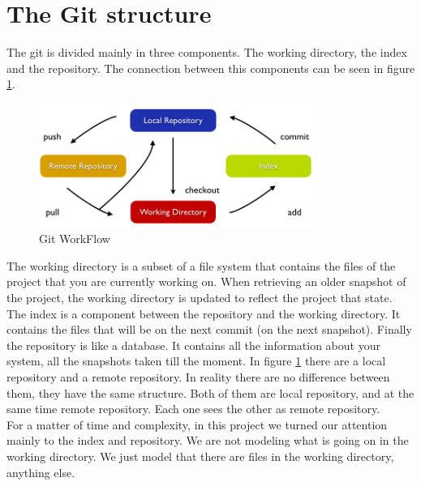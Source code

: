 \section{The Git structure}
The git is divided mainly in three components. The working directory,
the index and the repository. The connection between this components
can be seen in figure \ref{fig:git_structure}. 

\begin{figure}[h!]
   \centering
   \includegraphics[width=0.8\textwidth]{images/data_flow_simplified.png}
   \caption{Git WorkFlow}\label{fig:git_structure}
\end{figure}

The working directory is a subset of
a file system that contains the files of the project that you are
currently working on. When retrieving an older snapshot of the project, the
working directory is updated to reflect the project that state. The index is a
component between the repository and the working directory. It
contains the files that will be on the next commit
(on the next snapshot). Finally the repository is like a database. It contains 
all the information about your system, all the snapshots taken till
the moment. In figure \ref{fig:git_structure} there are a local
repository and a remote repository. In reality there are no difference
between them, they have the same structure. Both of them are local
repository, and at the same time remote repository. Each one sees the 
other as remote repository.\\

For a matter of time and complexity, in this project we turned our attention 
mainly to the index and repository. We are not modeling what is going
on in the working directory. We just model that there are files in the
working directory, anything else.
